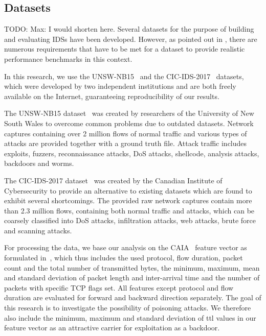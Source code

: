 \documentclass[10pt,sigconf,letterpaper,dvipsnames]{acmart}
\newcommand\note[2]{{\color{#1}#2}}
\newcommand\todo[1]{{\note{red}{TODO: #1}}}
\newcommand{\unsw}{UNSW-NB15}
\begin{document}
\subsection{Datasets}
\todo{Max: I would shorten here.}
Several datasets for the purpose of building and evaluating IDSs have been developed. However, as pointed out in \cite{gharib_evaluation_2016}, there are numerous requirements that have to be met for a dataset to provide realistic performance benchmarks in this context.

In this research, we use the \unsw{}~\cite{moustafa_unsw-nb15:_2015} and the CIC-IDS-2017~\cite{sharafaldin_toward_2018} datasets, which were developed by two independent institutions and are both freely available on the Internet, guaranteeing reproducibility of our results.

The \unsw{} dataset~\cite{moustafa_unsw-nb15:_2015} was created by researchers of the University of New South Wales to overcome common problems due to outdated datasets. Network captures containing over 2 million flows of normal traffic and various types of attacks are provided together with a ground truth file. Attack traffic includes exploits, fuzzers, reconnaissance attacks, DoS attacks, shellcode, analysis attacks, backdoors and worms.

The CIC-IDS-2017 dataset~\cite{sharafaldin_toward_2018} was created by the Canadian Institute of Cybersecurity to provide an alternative to existing datasets which are found to exhibit several shortcomings. The provided raw network captures contain more than 2.3 million flows, containing both normal traffic and attacks, which can be coarsely classified into DoS attacks, infiltration attacks, web attacks, brute force and scanning attacks.

For processing the data, we base our analysis on the CAIA~\cite{williams_preliminary_2006} feature vector as formulated in~\cite{meghdouri_analysis_2018}, which thus includes the used protocol, flow duration, packet count and the total number of transmitted bytes, the minimum, maximum, mean and standard deviation of packet length and inter-arrival time and the number of packets with specific TCP flags set. All features except protocol and flow duration are evaluated for forward and backward direction separately. The goal of this research is to investigate the possibility of poisoning attacks. We therefore also include the minimum, maximum and standard deviation of \gls{ttl} values in our feature vector as an attractive carrier for exploitation as a backdoor. %
\end{document}
